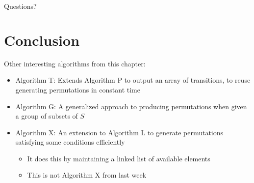 \documentclass[aspectratio=169]{beamer}
\begin{document}

\begin{frame}{}
      \begin{center}
    {\color{sigma@mainblue} \LARGE Questions?}
  \end{center}
\end{frame}


\section{Conclusion}
\frame{\sectionpage}

\begin{frame}
Other interesting algorithms from this chapter:
\begin{itemize}
    \item Algorithm T: Extends Algorithm P to output an array of transitions, to reuse generating permutations in constant time \pause
    \item Algorithm G: A generalized approach to producing permutations when given a group of subsets of $S$ \pause
    \item Algorithm X: An extension to Algorithm L to generate permutations satisfying some conditions efficiently
    \begin{itemize}
        \item It does this by maintaining a linked list of available elements
        \item This is not Algorithm X from last week
    \end{itemize}
\end{itemize}
\end{frame}
\end{document}

